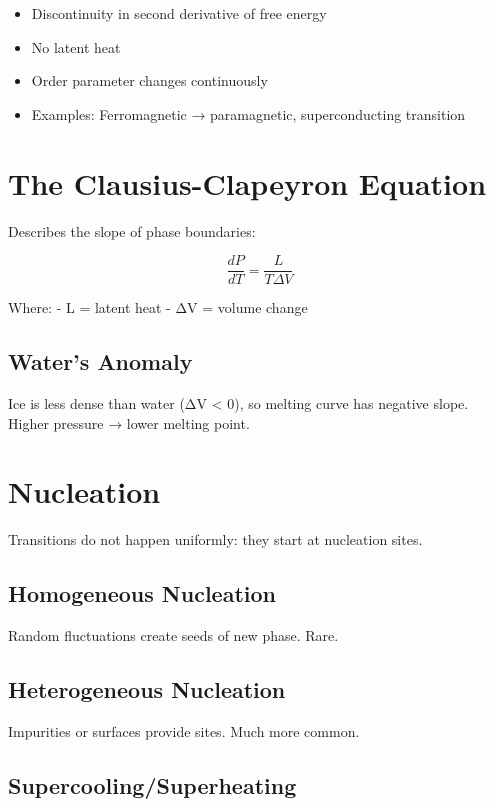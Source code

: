 \documentclass[
  11pt,
  letterpaper,
  twoside,
  openright]{book}
\providecommand{\tightlist}{%
  \setlength{\itemsep}{0pt}\setlength{\parskip}{0pt}}
\begin{document}
\begin{itemize}
\tightlist
\item
  Discontinuity in second derivative of free energy
\item
  No latent heat
\item
  Order parameter changes continuously
\item
  Examples: Ferromagnetic → paramagnetic, superconducting transition
\end{itemize}

\section{The Clausius-Clapeyron
Equation}\label{the-clausius-clapeyron-equation}

Describes the slope of phase boundaries:

\[
\frac{dP}{dT} = \frac{L}{T \Delta V}
\]

Where: - L = latent heat - ΔV = volume change

\subsection{Water's Anomaly}\label{waters-anomaly}

Ice is less dense than water (ΔV \textless{} 0), so melting curve has
negative slope. Higher pressure → lower melting point.

\section{Nucleation}\label{nucleation}

Transitions do not happen uniformly: they start at nucleation sites.

\subsection{Homogeneous Nucleation}\label{homogeneous-nucleation}

Random fluctuations create seeds of new phase. Rare.

\subsection{Heterogeneous Nucleation}\label{heterogeneous-nucleation}

Impurities or surfaces provide sites. Much more common.

\subsection{Supercooling/Superheating}\label{supercoolingsuperheating}
\end{document}
